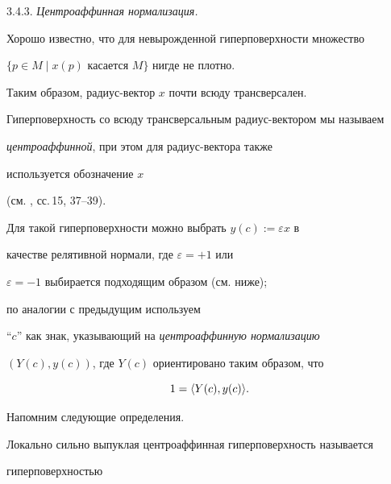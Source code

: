 3.4.3. {\it Центроаффинная нормализация.}


Хорошо известно, что для невырожденной гиперповерхности множество


$\{p \in M \mid x(p)$ касается $M\}$ нигде не плотно.


Таким образом, радиус-вектор $x$ почти всюду трансверсален.


Гиперповерхность со всюду трансверсальным радиус-вектором мы называем


{\it центроаффинной}, при этом для радиус-вектора также


используется обозначение $x$


(см.  \cite{NOM-SA}, сс.\,15, 37--39).


Для такой гиперповерхности можно выбрать $y(c):= \varepsilon x$ в


качестве релятивной нормали, где $ \varepsilon = +1$ или


$ \varepsilon = -1$ выбирается подходящим образом (см. ниже);


по аналогии с предыдущим используем


``$c$'' как знак, указывающий на {\it центроаффинную нормализацию}


$(Y(c), y(c))$, где $Y(c)$ ориентировано таким образом, что


$$


1 = \la Y(c),y(c)\ra .


$$


Напомним следующие определения.





Локально сильно выпуклая центроаффинная гиперповерхность называется


гиперповерхностью



